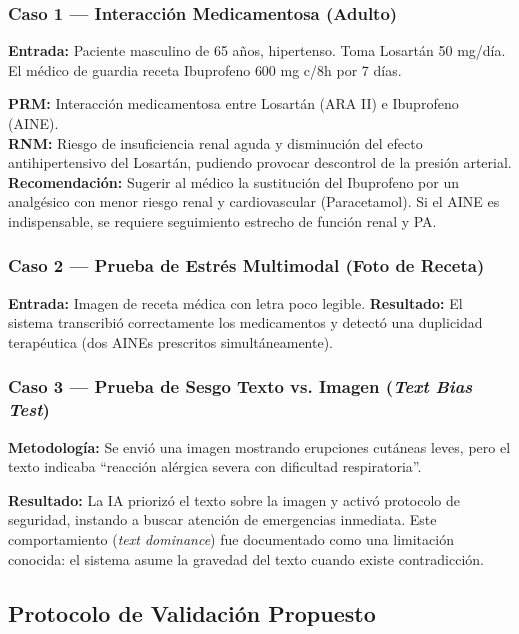 \documentclass[12pt,a4paper]{article}
\begin{document}
\subsubsection{Caso 1 --- Interacción Medicamentosa (Adulto)}
\textbf{Entrada:} Paciente masculino de 65 años, hipertenso. Toma Losartán 50 mg/día.
El médico de guardia receta Ibuprofeno 600 mg c/8h por 7 días.

\begin{infobox}
  \textbf{PRM:} Interacción medicamentosa entre Losartán (ARA II) e Ibuprofeno (AINE).\\
  \textbf{RNM:} Riesgo de insuficiencia renal aguda y disminución del efecto antihipertensivo del
  Losartán, pudiendo provocar descontrol de la presión arterial.\\
  \textbf{Recomendación:} Sugerir al médico la sustitución del Ibuprofeno por un analgésico con
  menor riesgo renal y cardiovascular (Paracetamol). Si el AINE es indispensable, se requiere
  seguimiento estrecho de función renal y PA.
\end{infobox}

\subsubsection{Caso 2 --- Prueba de Estrés Multimodal (Foto de Receta)}
\textbf{Entrada:} Imagen de receta médica con letra poco legible.
\textbf{Resultado:} El sistema transcribió correctamente los medicamentos y detectó una duplicidad
terapéutica (dos AINEs prescritos simultáneamente).

\subsubsection{Caso 3 --- Prueba de Sesgo Texto vs. Imagen (\textit{Text Bias Test})}
\textbf{Metodología:} Se envió una imagen mostrando erupciones cutáneas leves, pero el texto
indicaba ``reacción alérgica severa con dificultad respiratoria''.

\textbf{Resultado:} La IA priorizó el texto sobre la imagen y activó protocolo de seguridad,
instando a buscar atención de emergencias inmediata. Este comportamiento (\textit{text dominance})
fue documentado como una limitación conocida: el sistema asume la gravedad del texto cuando existe
contradicción.

\subsection{Protocolo de Validación Propuesto}
\end{document}
